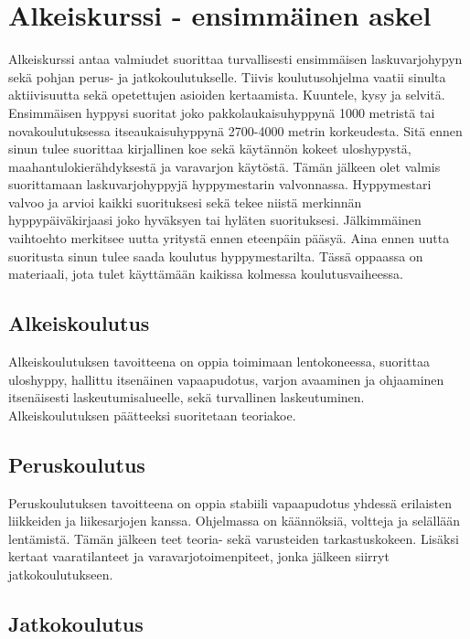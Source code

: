 \section{ Alkeiskurssi - ensimmäinen askel }
\label{laskuvarjohyppykoulutus-alkeiskurssi-ensimmainen-askel}


Alkeiskurssi antaa valmiudet suorittaa turvallisesti ensimmäisen laskuvarjohypyn sekä pohjan perus- ja jatkokoulutukselle. Tiivis koulutusohjelma vaatii sinulta aktiivisuutta sekä opetettujen asioiden kertaamista. Kuuntele, kysy ja selvitä. Ensimmäisen hyppysi suoritat joko pakkolaukaisuhyppynä 1000 metristä tai novakoulutuksessa itseaukaisuhyppynä 2700-4000 metrin korkeudesta. Sitä ennen sinun tulee suorittaa kirjallinen koe sekä käytännön kokeet uloshypystä, maahantulokierähdyksestä ja varavarjon käytöstä. Tämän jälkeen olet valmis suorittamaan laskuvarjohyppyjä hyppymestarin valvonnassa. Hyppymestari valvoo ja arvioi kaikki suorituksesi sekä tekee niistä merkinnän hyppypäiväkirjaasi joko hyväksyen tai hyläten suorituksesi. Jälkimmäinen vaihtoehto merkitsee uutta yritystä ennen eteenpäin pääsyä. Aina ennen uutta suoritusta sinun tulee saada koulutus hyppymestarilta. Tässä oppaassa on materiaali, jota tulet käyttämään kaikissa kolmessa koulutusvaiheessa. 

\subsection{Alkeiskoulutus}
\label{laskuvarjohyppykoulutus-alkeiskoulutus}


Alkeiskoulutuksen tavoitteena on oppia toimimaan lentokoneessa, suorittaa uloshyppy, hallittu itsenäinen vapaapudotus, varjon avaaminen ja ohjaaminen itsenäisesti laskeutumisalueelle, sekä turvallinen laskeutuminen. Alkeiskoulutuksen päätteeksi suoritetaan teoriakoe. 

\subsection{Peruskoulutus}
\label{laskuvarjohyppykoulutus-peruskoulutus}


Peruskoulutuksen tavoitteena on oppia stabiili vapaapudotus yhdessä erilaisten liikkeiden ja liikesarjojen kanssa. Ohjelmassa on käännöksiä, voltteja ja selällään lentämistä. Tämän jälkeen teet teoria- sekä varusteiden tarkastuskokeen. Lisäksi kertaat vaaratilanteet ja varavarjotoimenpiteet, jonka jälkeen siirryt jatkokoulutukseen. 

\subsection{Jatkokoulutus}
\label{laskuvarjohyppykoulutus-jatkokoulutus}



